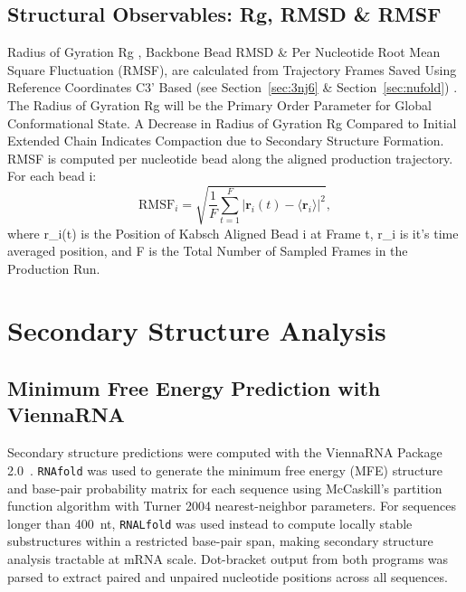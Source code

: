 \subsection{Structural Observables: Rg, RMSD & RMSF} \label{sec:structural_obs}
Radius of Gyration Rg , Backbone Bead RMSD & Per Nucleotide Root Mean Square Fluctuation (RMSF), are calculated from Trajectory Frames Saved Using Reference Coordinates C3’ Based (see Section~\ref{sec:3nj6} & Section~\ref{sec:nufold}) .
The Radius of Gyration Rg will be the Primary Order Parameter for Global Conformational State. A Decrease in Radius of Gyration Rg Compared to Initial Extended Chain Indicates Compaction due to Secondary Structure Formation.
RMSF is computed per nucleotide bead along the aligned production trajectory. For each bead i:
\begin{equation}\mathrm{RMSF}_i = \sqrt{\frac{1}{F}\sum_{t=1}^{F}\left|\mathbf{r}_i(t) - \langle\mathbf{r}_i\rangle\right|^2},\label{eq:rmsf}\end{equation}
where r_i(t) is the Position of Kabsch Aligned Bead i at Frame t, \langle r_i \rangle is it's time averaged position, and F is the Total Number of Sampled Frames in the Production Run.






\section{Secondary Structure Analysis}
\label{sec:sec_struct}

\subsection{Minimum Free Energy Prediction with ViennaRNA}

Secondary structure predictions were computed with the ViennaRNA
Package 2.0~\cite{Lorenz2011}.
\texttt{RNAfold} was used to generate the minimum free energy (MFE)
structure and base-pair probability matrix for each sequence using
McCaskill's partition function algorithm with Turner 2004
nearest-neighbor parameters.
For sequences longer than 400~nt, \texttt{RNALfold} was used instead
to compute locally stable substructures within a restricted base-pair
span, making secondary structure analysis tractable at mRNA scale.
Dot-bracket output from both programs was parsed to extract paired and
unpaired nucleotide positions across all sequences.

